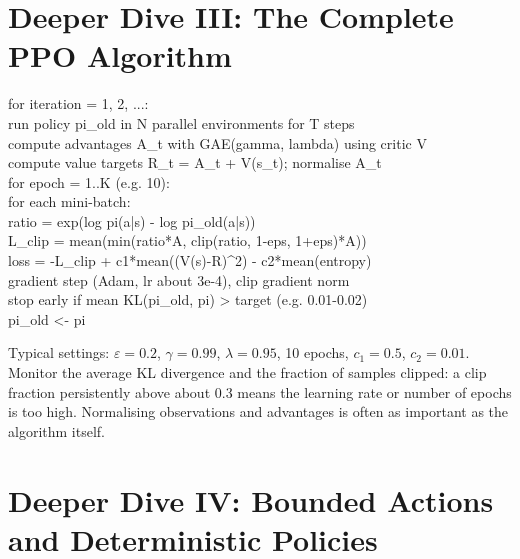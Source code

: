 \documentclass[11pt]{article}
\begin{document}
\section{Deeper Dive III: The Complete PPO Algorithm}
\begin{center}\begin{minipage}{0.92\textwidth}\small\ttfamily
for iteration = 1, 2, ...:\\
\hspace*{1em}run policy pi\_old in N parallel environments for T steps\\
\hspace*{1em}compute advantages A\_t with GAE(gamma, lambda) using critic V\\
\hspace*{1em}compute value targets R\_t = A\_t + V(s\_t); normalise A\_t\\
\hspace*{1em}for epoch = 1..K (e.g. 10):\\
\hspace*{2em}for each mini-batch:\\
\hspace*{3em}ratio = exp(log pi(a|s) - log pi\_old(a|s))\\
\hspace*{3em}L\_clip = mean(min(ratio*A, clip(ratio, 1-eps, 1+eps)*A))\\
\hspace*{3em}loss = -L\_clip + c1*mean((V(s)-R)\textasciicircum2) - c2*mean(entropy)\\
\hspace*{3em}gradient step (Adam, lr about 3e-4), clip gradient norm\\
\hspace*{2em}stop early if mean KL(pi\_old, pi) > target (e.g. 0.01-0.02)\\
\hspace*{1em}pi\_old <- pi
\end{minipage}\end{center}
Typical settings: $\varepsilon=0.2$, $\gamma=0.99$, $\lambda=0.95$, 10 epochs, $c_1=0.5$, $c_2=0.01$. Monitor the average KL divergence and the fraction of samples clipped: a clip fraction persistently above about 0.3 means the learning rate or number of epochs is too high. Normalising observations and advantages is often as important as the algorithm itself.

\section{Deeper Dive IV: Bounded Actions and Deterministic Policies}
\end{document}
